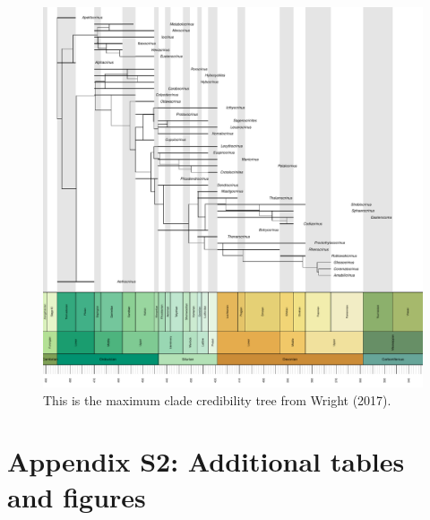 \documentclass[12pt,a4paper]{article}
\begin{document}
\begin{figure}[!htbp]
    \centering
    \includegraphics[width=1\linewidth, height=1\textheight, keepaspectratio]{figures/fig-tree-Wright2017-appendix.pdf}
    \caption[Wright2017.]
    {This is the maximum clade credibility tree from Wright (2017).}
    \label{figure:wright}
  \end{figure}  

\newpage
\section{Appendix S2: Additional tables and figures}

\setcounter{figure}{0}  
\setcounter{table}{0}  
\end{document}
